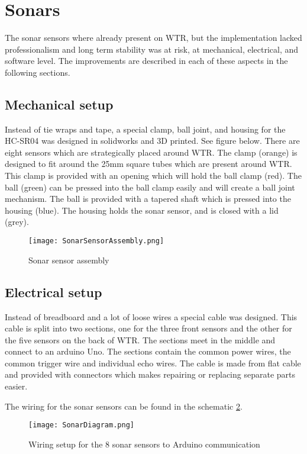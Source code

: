 \section{Sonars}
The sonar sensors where already present on WTR, but the implementation lacked professionalism and long term stability was at risk, at mechanical, electrical, and software level.
The improvements are described in each of these aspects in the following sections.

\subsection{Mechanical setup}
Instead of tie wraps and tape, a special clamp, ball joint, and housing for the HC-SR04 was designed in solidworks and 3D printed. See figure below.
There are eight sensors which are strategically placed around WTR.
The clamp (orange) is designed to fit around the 25mm square tubes which are present around WTR. 
This clamp is provided with an opening which will hold the ball clamp (red).
The ball (green) can be pressed into the ball clamp easily and will create a ball joint mechanism.
The ball is provided with a tapered shaft which is pressed into the housing (blue).
The housing holds the sonar sensor, and is closed with a lid (grey).

\begin{figure}[H]
\centering
\texttt{[image: SonarSensorAssembly.png]}
\caption{Sonar sensor assembly}
\label{fig::sonarassembly}
\end{figure}


\subsection{Electrical setup}
Instead of breadboard and a lot of loose wires a special cable was designed. 
This cable is split into two sections, one for the three front sensors and the other for the five sensors on the back of WTR.
The sections meet in the middle and connect to an arduino Uno.
The sections contain the common power wires, the common trigger wire and individual echo wires.
The cable is made from flat cable and provided with connectors which makes repairing or replacing separate parts easier.

The wiring for the sonar sensors can be found in the schematic \ref{fig::wiringsonar}.

\begin{figure}[H]
\centering
\texttt{[image: SonarDiagram.png]}
\caption{Wiring setup for the 8 sonar sensors to Arduino communication}
\label{fig::wiringsonar}
\end{figure}

 
\newpage    